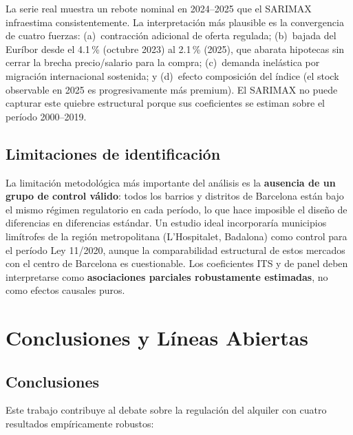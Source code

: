 \documentclass[12pt,a4paper]{article}
\begin{document}
La serie real muestra un rebote nominal en 2024--2025 que el SARIMAX infraestima
consistentemente. La interpretación más plausible es la convergencia de cuatro fuerzas:
(a)~contracción adicional de oferta regulada; (b)~bajada del Euríbor desde el 4.1\,\%
(octubre 2023) al 2.1\,\% (2025), que abarata hipotecas sin cerrar la brecha
precio/salario para la compra; (c)~demanda inelástica por migración internacional
sostenida; y (d)~efecto composición del índice (el stock observable en 2025 es
progresivamente más premium). El SARIMAX no puede capturar este quiebre estructural
porque sus coeficientes se estiman sobre el período 2000--2019.

\subsection{Limitaciones de identificación}

La limitación metodológica más importante del análisis es la \textbf{ausencia de un
grupo de control válido}: todos los barrios y distritos de Barcelona están bajo el
mismo régimen regulatorio en cada período, lo que hace imposible el diseño de
diferencias en diferencias estándar. Un estudio ideal incorporaría municipios
limítrofes de la región metropolitana (L'Hospitalet, Badalona) como control para el
período Ley 11/2020, aunque la comparabilidad estructural de estos mercados con el
centro de Barcelona es cuestionable. Los coeficientes ITS y de panel deben
interpretarse como \textbf{asociaciones parciales robustamente estimadas}, no como
efectos causales puros.

\section{Conclusiones y Líneas Abiertas}
\label{sec:conclusiones}

\subsection{Conclusiones}

Este trabajo contribuye al debate sobre la regulación del alquiler con cuatro
resultados empíricamente robustos:
\end{document}
